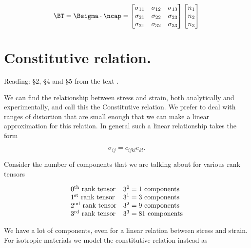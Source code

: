 \begin{equation}\label{eqn:continuumL5:50}
\BT = \Bsigma \cdot \ncap
=
\begin{bmatrix}
\sigma_{11} & \sigma_{12} & \sigma_{13} \\
\sigma_{21} & \sigma_{22} & \sigma_{23} \\
\sigma_{31} & \sigma_{32} & \sigma_{33}
\end{bmatrix}
\begin{bmatrix}
n_1 \\
n_2 \\
n_3
\end{bmatrix}
\end{equation}

\section{Constitutive relation.}

Reading: \S 2, \S 4 and \S 5 from the text \cite{landau1960theory}.

We can find the relationship between stress and strain, both analytically and experimentally, and call this the Constitutive relation.  We prefer to deal with ranges of distortion that are small enough that we can make a linear approximation for this relation.  In general such a linear relationship takes the form

\begin{equation}\label{eqn:continuumL5:70}
\sigma_{ij} = c_{ijkl} e_{kl}.
\end{equation}

Consider the number of components that we are talking about for various rank tensors

\begin{equation}\label{eqn:continuumL5:90}
\begin{array}{l l}
\mbox{$0^\text{th}$ rank tensor} & \mbox{$3^0 = 1$ components} \\
\mbox{$1^\text{st}$ rank tensor} & \mbox{$3^1 = 3$ components} \\
\mbox{$2^\text{nd}$ rank tensor} & \mbox{$3^2 = 9$ components} \\
\mbox{$3^\text{rd}$ rank tensor} & \mbox{$3^3 = 81$ components}
\end{array}
\end{equation}

We have a lot of components, even for a linear relation between stress and strain.  For isotropic materials we model the constitutive relation instead as

